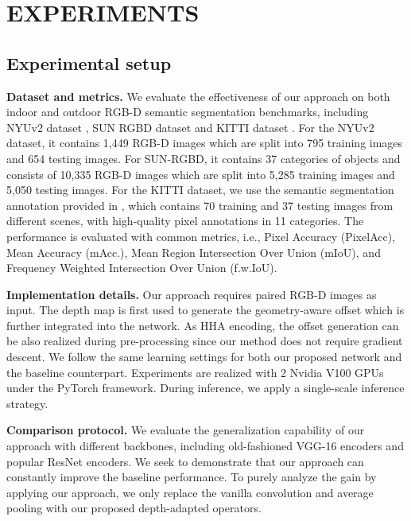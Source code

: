 \documentclass[lettersize,journal]{IEEEtran}
\begin{document}
\section{EXPERIMENTS}
\subsection{Experimental setup}
\label{sec:setup}

\textbf{Dataset and metrics.} We evaluate the effectiveness of our approach on both indoor and outdoor RGB-D semantic segmentation benchmarks, including NYUv2 dataset \cite{silberman2012NYUV2}, SUN RGBD dataset \cite{song2015sun} and KITTI dataset \cite{kitti}. For the NYUv2 dataset, it contains 1,449 RGB-D images which are split into 795 training images and 654 testing images. For SUN-RGBD, it contains 37 categories of objects and consists of 10,335 RGB-D images which are split into 5,285 training images and 5,050 testing images. For the KITTI dataset, we use the semantic segmentation annotation provided in \cite{xu:kitti}, which contains 70 training and 37 testing images from different scenes, with high-quality pixel annotations in 11 categories. The performance is evaluated with common metrics, i.e., Pixel Accuracy (PixelAcc), Mean Accuracy (mAcc.), Mean Region Intersection Over Union (mIoU), and Frequency Weighted Intersection Over Union (f.w.IoU).



\textbf{Implementation details.} Our approach requires paired RGB-D images as input. The depth map is first used to generate the geometry-aware offset which is further integrated into the network. As HHA encoding, the offset generation can be also realized during pre-processing since our method does not require gradient descent. We follow the same learning settings for both our proposed network and the baseline counterpart. Experiments are realized with 2 Nvidia V100 GPUs under the PyTorch framework. During inference, we apply a single-scale inference strategy.


\textbf{Comparison protocol.} We evaluate the generalization capability of our approach with different backbones, including old-fashioned VGG-16 encoders and popular ResNet encoders. We seek to demonstrate that our approach can constantly improve the baseline performance. To purely analyze the gain by applying our approach, we only replace the vanilla convolution and average pooling with our proposed depth-adapted operators. 
\end{document}
